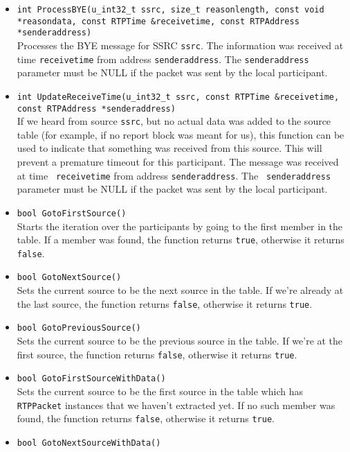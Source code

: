 \documentclass[12pt,a4paper]{article}
\begin{document}
\begin{itemize}
					\item {\tt int ProcessBYE(u\_int32\_t ssrc, size\_t reasonlength, const void *reasondata, const RTPTime \&receivetime,
					                          const RTPAddress *senderaddress)}\\
						Processes the BYE message for SSRC {\tt ssrc}. The
						information was received at time {\tt receivetime} from
						address {\tt senderaddress}. The {\tt senderaddress}
						parameter must be NULL if the packet was sent by the
						local participant.
					\item {\tt int UpdateReceiveTime(u\_int32\_t ssrc, const RTPTime \&receivetime, const RTPAddress *senderaddress)}\\
						If we heard from source {\tt ssrc}, but no actual
						data was added to the source table (for example, if
						no report block was meant for us), this function can
						be used to indicate that something was received from
						this source. This will prevent a premature timeout for
						this participant. The message was received at time {\tt
						receivetime} from address {\tt senderaddress}. The {\tt
						senderaddress} parameter must be NULL if the packet was
						sent by the local participant.
					\item {\tt bool GotoFirstSource()}\\
						Starts the iteration over the participants by going to the
						first member in the table. If a member was found, the function
						returns {\tt true}, otherwise it returns {\tt false}.
					\item {\tt bool GotoNextSource()}\\
						Sets the current source to be the next source in the table.
						If we're already at the last source, the function returns
						{\tt false}, otherwise it returns {\tt true}.
					\item {\tt bool GotoPreviousSource()}\\
						Sets the current source to be the previous source in the table.
						If we're at the first source, the function returns
						{\tt false}, otherwise it returns {\tt true}.
					\item {\tt bool GotoFirstSourceWithData()}\\
						Sets the current source to be the first source in the table
						which has {\tt RTPPacket} instances that we haven't extracted
						yet. If no such member was found, the function returns {\tt false},
						otherwise it returns {\tt true}.
					\item {\tt bool GotoNextSourceWithData()}\\

\end{itemize}
\end{document}
